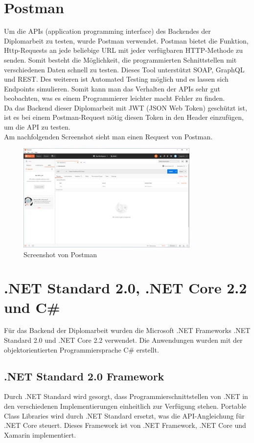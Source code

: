 \section{Postman}
Um die APIs (application programming interface) des Backendes der Diplomarbeit zu testen, wurde Postman verwendet. Postman bietet die Funktion, Http-Requests an jede beliebige URL mit jeder verfügbaren HTTP-Methode zu senden. Somit besteht die Möglichkeit, die programmierten Schnittstellen mit verschiedenen Daten schnell zu testen. Dieses Tool unterstützt SOAP, GraphQL und REST. Des weiteren ist Automated Testing möglich und es lassen sich Endpoints simulieren. Somit kann man das Verhalten der APIs sehr gut beobachten, was es einem Programmierer leichter macht Fehler zu finden. \autocite{postmanDocs} \\
Da das Backend dieser Diplomarbeit mit JWT (JSON Web Token) geschützt ist, ist es bei einem Postman-Request nötig diesen Token in den Header einzufügen, um die API zu testen.  \\
Am nachfolgenden Screenshot sieht man einen Request von Postman.
\begin{figure}[H]
	\centerline{
		\includegraphics[width=0.8\textwidth]{./grafiken/postman.png}
	}
	\vskip0pt
	\caption{Screenshot von Postman} \label{fig:postman}
\end{figure}

\section{.NET Standard 2.0, .NET Core 2.2 und C\#}
Für das Backend der Diplomarbeit wurden die Microsoft .NET Frameworks .NET Standard 2.0 und .NET Core 2.2 verwendet. Die Anwendungen wurden mit der objektorientierten Programmiersprache C\#  erstellt. \autocite{wikiDotnet}
\subsection{.NET Standard 2.0 Framework}
Durch .NET Standard wird gesorgt, dass Programmierschnittstellen von .NET in den verschiedenen Implementierungen einheitlich zur Verfügung stehen. Portable Class Libraries wird durch .NET Standard ersetzt, was die API-Angleichung für .NET Core steuert. Dieses Framework ist von .NET Framework, .NET Core und Xamarin implementiert. \autocite{wikiDotnet}

